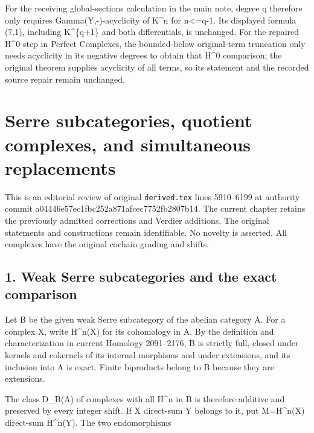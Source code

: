 \documentclass[11pt]{article}
\begin{document}
For the receiving global-sections calculation in the main note,\allowbreak{} degree q therefore only requires Gamma(Y,\allowbreak{}-)\allowbreak{}-acyclicity of K\^{}n for n<\allowbreak{}=q-1. Its displayed formula (7.1)\allowbreak{},\allowbreak{} including K\textasciicircum{}\{q\allowbreak{}+1\} and both differentials,\allowbreak{} is unchanged. For the repaired H\^{}0 step in Perfect Complexes,\allowbreak{} the bounded-below original-term truncation only needs acyclicity in its negative degrees to obtain that H\^{}0 comparison; the original theorem supplies acyclicity of all terms,\allowbreak{} so its statement and the recorded source repair remain unchanged.
\clearpage
\section{\texorpdfstring{Serre subcategories,\allowbreak{} quotient complexes,\allowbreak{} and simultaneous replacements}{Serre  quotient  and simultaneous replacements}}\label{proofs-5910-6199-serre-subcategories-quotient-complexes-and-simultaneous-replacements}

This is an editorial review of original \texttt{derived.\allowbreak{}tex} lines 5910–\allowbreak{}6199 at authority commit a04446e5\allowbreak{}7ec1fbc2\allowbreak{}52a871af\allowbreak{}cec7752f\allowbreak{}b2807b14. The current chapter retains the previously admitted corrections and Verdier additions. The original statements and constructions remain identifiable. No novelty is asserted. All complexes have the original cochain grading and shifts.

\subsection{1. Weak Serre subcategories and the exact comparison}\label{proofs-5910-6199-weak-serre-subcategories-and-the-exact-comparison}

Let B be the given weak Serre subcategory of the abelian category A. For a complex X,\allowbreak{} write H\textasciicircum{}n(X)\allowbreak{} for its cohomology in A. By the definition and characterization in current Homology 2091–\allowbreak{}2176,\allowbreak{} B is strictly full,\allowbreak{} closed under kernels and cokernels of its internal morphisms and under extensions,\allowbreak{} and its inclusion into A is exact. Finite biproducts belong to B because they are extensions.

The class D\_\allowbreak{}B(A)\allowbreak{} of complexes with all H\^{}n in B is therefore additive and preserved by every integer shift. If X direct-sum Y belongs to it,\allowbreak{} put M\allowbreak{}=H\textasciicircum{}n(X)\allowbreak{} direct-sum H\textasciicircum{}n(Y)\allowbreak{}. The two endomorphisms
\end{document}

